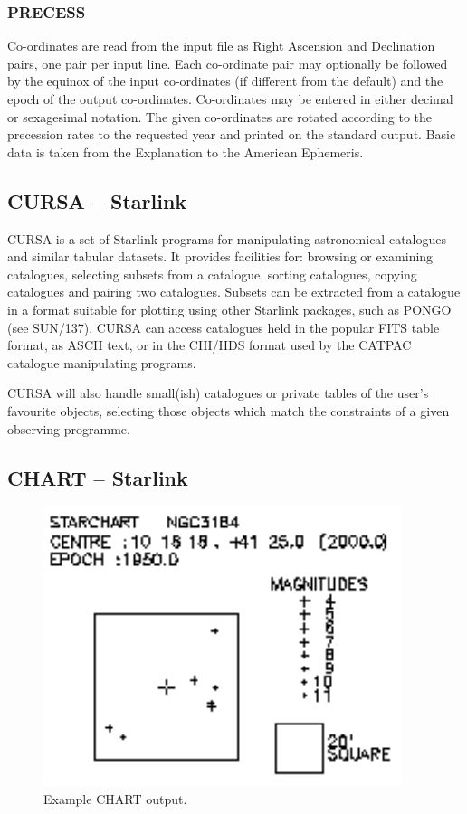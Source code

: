 \documentclass[twoside,11pt]{article}
\newcommand{\htmladdnormallink}[2]{#1}
\newcommand{\xref}[3]{#1}
\newcommand{\xlabel}[1]{}
\newcommand{\STARLINKref}{\htmladdnormallink{Starlink}{http://www.starlink.ac.uk/}}
\newcommand{\CATPACref}{\xref{CATPAC}{sun120}{}}
\newcommand{\CURSAref}{\xref{CURSA}{sun190}{}}
\newcommand{\PONGOref}{\xref{PONGO}{sun137}{}}
\newcommand{\PONGSUNref}{\xref{SUN/137}{sun137}{}}
\newcommand{\CHARTref}{\xref{CHART}{sun32}{}}
\begin{document}
\subsubsection{PRECESS}

Co-ordinates are read from the input file as Right Ascension and Declination pairs, one pair per
input line.  Each co-ordinate pair may optionally be followed by the equinox
of the input co-ordinates (if different from the default) and the epoch of the
output co-ordinates.  Co-ordinates may be entered in either decimal or
sexagesimal notation.  The given co-ordinates are rotated according to the
precession rates to the requested year and printed on the standard output.
Basic data is taken from the Explanation to the American Ephemeris.


\subsection{{\CURSAref} -- {\STARLINKref}} \xlabel{CURSA}
\label{sec:cursa}


{\CURSAref} is a set of {\STARLINKref} programs for manipulating astronomical
catalogues and similar tabular datasets. It provides facilities for: browsing
or examining catalogues, selecting subsets from a catalogue, sorting
catalogues, copying catalogues and pairing two catalogues. Subsets can be
extracted from a catalogue in a format suitable for plotting using other
Starlink packages, such as {\PONGOref} (see {\PONGSUNref)}. CURSA can access
catalogues held in the popular FITS table format, as ASCII text, or in the
CHI/HDS format used by the {\CATPACref} catalogue manipulating programs.

CURSA will also handle small(ish) catalogues or private tables of the user's
favourite objects, selecting those objects which match the constraints of a given
observing programme.

\subsection{{\CHARTref} -- {\STARLINKref}} \xlabel{CHART}
\label{sec:chart}

\begin{figure}[htbp]
\leavevmode
\centering \includegraphics{sg10_chart}
\vspace{5mm}
\caption{Example CHART output.}
\label{fig_chart}
\xlabel{fig_chart}
\end{figure}
\end{document}
